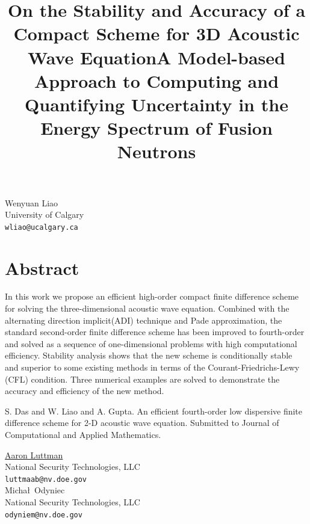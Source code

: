 \documentclass[article, A4, 11pt]{llncs}%
\begin{document}
\title{On the Stability and Accuracy of a Compact Scheme for 3D Acoustic Wave Equation}
 \author{} \institute{}
\maketitle
\begin{center}
{\large Wenyuan Liao}\\
University of Calgary\\
{\tt wliao@ucalgary.ca}
\end{center}

\section*{Abstract}
In this work we propose an efficient high-order compact finite difference scheme for solving the three-dimensional acoustic wave equation.
Combined with the alternating direction implicit(ADI) technique and Pade approximation, the standard second-order finite difference scheme has been improved to fourth-order and solved as a sequence of one-dimensional problems with high computational efficiency. Stability analysis shows that the new scheme is conditionally stable  and superior to some existing methods in terms of the Courant-Friedrichs-Lewy (CFL) condition. Three numerical examples are solved to demonstrate the accuracy and efficiency of the new method.


\begin{thebibliography}{10}
{\sc S. Das and W. Liao and A. Gupta}. {An efficient fourth-order low dispersive finite difference scheme for  2-D acoustic wave equation}. Submitted to Journal of Computational and Applied Mathematics.
\end{thebibliography} %

\title{A Model-based Approach to Computing and Quantifying Uncertainty in the Energy Spectrum of Fusion Neutrons}
 \author{} \institute{}
\maketitle
\begin{center}
{\large \underline{Aaron Luttman}}\\
National Security Technologies, LLC\\
{\tt luttmaab@nv.doe.gov}
\\ \vspace{4mm}
{\large Micha\l\, Odyniec}\\
National Security Technologies, LLC\\
{\tt odyniem@nv.doe.gov}
\end{center}
\end{document}
